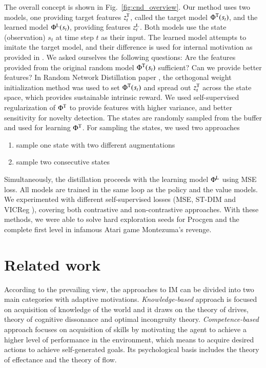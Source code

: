 \documentclass[a4paper,11pt]{elsarticle}
\begin{document}
The overall concept is shown in Fig.~\ref{fig:cnd_overview}.
Our method uses two models, one providing target features $z_{t}^{\rm T}$, called the target model $\Phi^{\rm T}(s_t)$, and the learned model $\Phi^{\rm L}(s_t)$, providing features $z_{t}^{\rm L}$. Both models use the state (observation) $s_t$ at time step $t$ as their input. 
The learned model attempts to imitate the target model, and their difference is used for internal motivation as provided in \cite{burda2018exploration}.
We asked ourselves the following questions: Are the features provided from the original random model $\Phi^{\rm T}(s_t)$ sufficient? Can we provide better features? In Random Network Distillation paper \citep{burda2018exploration}, the orthogonal weight initialization method was used to set $\Phi^{\rm T}(s_t)$ and spread out $z_{t}^{\rm T}$ across the state space, which provides sustainable intrinsic reward.
We used self-supervised regularization of $\Phi^{\rm T}$ to provide features with higher variance, and better sensitivity for novelty detection. 
The states are randomly sampled from the buffer and used for learning $\Phi^{\rm T}$. 
For sampling the states, we used two approaches
\begin{enumerate}
    \item sample one state with two different augmentations
    \item sample two consecutive states
\end{enumerate}
Simultaneously, the distillation proceeds with the learning model $\Phi^{\rm L}$ using MSE loss.
All models are trained in the same loop as the policy and the value models.
We experimented with different self-supervised losses (MSE, ST-DIM \cite{Anand2019} and VICReg \cite{Bardes2022}), covering both contrastive and non-contrastive approaches.
With these methods, we were able to solve hard exploration seeds for Procgen and the complete  first level in infamous Atari game Montezuma's revenge.

\section{Related work}
\label{sec:related-work}

According to the prevailing view, the approaches to IM can be divided into two main categories with adaptive motivations.
\textit{Knowledge-based} approach is focused on acquisition of knowledge of the world and it draws on the theory of drives, theory of cognitive dissonance and optimal incongruity theory. \textit{Competence-based} approach focuses on acquisition of skills by motivating the agent to achieve a higher level of performance in the environment, which means to acquire desired actions to achieve self-generated goals. Its psychological basis includes the theory of effectance and the theory of flow. 
\end{document}
